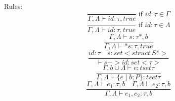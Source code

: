 Rules:
\[
\frac{}{\Gamma,\Lambda \vdash id : \tau,true} \mbox{ if $id:\tau \in \Gamma$}
\]
\[
\frac{}{\Gamma,\Lambda \vdash id : \tau,true} \mbox{ if $id:\tau \in \Lambda$}
\]
\[
\frac{\Gamma,\Lambda\vdash s:\tau*,b}{\Gamma,\Lambda \vdash *s: \tau,true}
\]
\[
\frac{id:\tau \quad s: set<struct~S*>}{\vdash s->id : set<\tau>}
\]
\[
\frac{\Gamma,b\cup \Lambda \vdash e: tset \tau}
{\Gamma,\Lambda\vdash \{ e \mid b ; P \} : tset \tau }
\]
\[
\frac{\Gamma,\Lambda\vdash e_1:\tau,b \quad \Gamma,\Lambda\vdash e_2:\tau,b}
{\Gamma,\Lambda\vdash e_1,e_2: \tau,b}
\]

